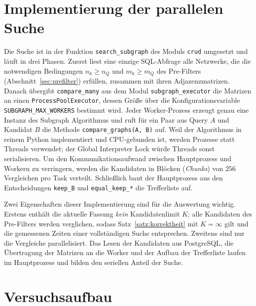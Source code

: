\documentclass[a4paper,12pt, twoside]{report}
\theoremstyle{definition}
\begin{document}
\section{Implementierung der parallelen Suche}

Die Suche ist in der Funktion \texttt{search\_subgraph} des Moduls \texttt{crud} umgesetzt und läuft in drei Phasen. Zuerst liest eine einzige SQL-Abfrage alle Netzwerke, die die notwendigen Bedingungen $n_k \ge n_Q$ und $m_k \ge m_Q$ des Pre-Filters (Abschnitt~\ref{sec:prefilter}) erfüllen, zusammen mit ihren Adjazenzmatrizen. Danach übergibt \texttt{compare\_many} aus dem Modul \texttt{subgraph\_executor} die Matrizen an einen \texttt{ProcessPoolExecutor}, dessen Größe über die Konfigurationsvariable \texttt{SUBGRAPH\_MAX\_WORKERS} bestimmt wird. Jeder Worker-Prozess erzeugt genau eine Instanz des Subgraph Algorithmus und ruft für ein Paar aus Query $A$ und Kandidat $B$ die Methode \texttt{compare\_graphs(A, B)} auf. Weil der Algorithmus in reinem Python implementiert und CPU-gebunden ist, werden Prozesse statt Threads verwendet; der Global Interpreter Lock würde Threads sonst serialisieren. Um den Kommunikationsaufwand zwischen Hauptprozess und Workern zu verringern, werden die Kandidaten in Blöcken (\emph{Chunks}) von $256$ Vergleichen pro Task verteilt. Schließlich baut der Hauptprozess aus den Entscheidungen \texttt{keep\_B} und \texttt{equal\_keep\_*} die Trefferliste auf.

Zwei Eigenschaften dieser Implementierung sind für die Auswertung wichtig. Erstens enthält die aktuelle Fassung \emph{kein} Kandidatenlimit $K$; alle Kandidaten des Pre-Filters werden verglichen, sodass Satz~\ref{satz:korrektheit} mit $K=\infty$ gilt und die gemessenen Zeiten einer vollständigen Suche entsprechen. Zweitens sind nur die Vergleiche parallelisiert. Das Lesen der Kandidaten aus PostgreSQL, die Übertragung der Matrizen an die Worker und der Aufbau der Trefferliste laufen im Hauptprozess und bilden den seriellen Anteil der Suche.

\section{Versuchsaufbau}
\end{document}
